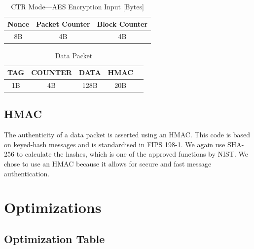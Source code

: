 \documentclass[a4paper]{article}
\begin{document}
\begin{table}[H]
    \begin{center}
        \begin{tabular}{| c | c | c |}
            \hline
            Nonce & Packet Counter & Block Counter \\ \hline
            8B & 4B & 4B \\
            \hline
        \end{tabular}
    \end{center}

    \caption{CTR Mode---AES Encryption Input [Bytes]}
    \label{tab:ctr_mode_aes_encryption_input}
\end{table}
\begin{table}[H]
    \begin{center}
        \begin{tabular}{| c | c | c | c | c |}
            \hline
            TAG & COUNTER & DATA & HMAC \\ \hline
            1B & 4B & 128B & 20B \\
            \hline
        \end{tabular}
    \end{center}
    
    \caption{Data Packet}
    \label{tab:data_packet}
\end{table}

\subsection{HMAC}

The authenticity of a data packet is asserted using an HMAC. This code is based on keyed-hash messages and is standardised in FIPS 198-1. We again use SHA-256 to calculate the hashes, which is one of the approved functions by NIST. We chose to use an HMAC because it allows for secure and fast message authentication.

\section{Optimizations}

\subsection{Optimization Table}
\end{document}
